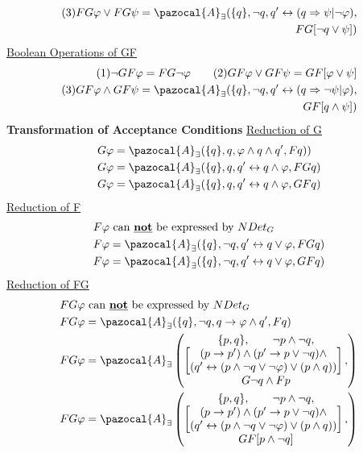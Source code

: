 \documentclass{article}
\newcommand{\Ab}{\pazocal{A}}
\begin{document}
\begin{multicols}{4}
\begin{align*}
(3) FG \varphi \vee FG \psi = \Ab_{\exists}(\{q\}, \neg q, q' \leftrightarrow (q \Rightarrow \psi | \neg \varphi),\\
FG[\neg q \vee \psi])
\end{align*}
\underline{Boolean Operations of GF}
\begin{align*}
(1)\neg GF \varphi = FG \neg \varphi \qquad(2)GF \varphi \vee GF \psi = GF[\varphi \vee \psi]\\
(3) GF \varphi \wedge GF \psi = \Ab_{\exists}(\{q\}, \neg q, q' \leftrightarrow (q \Rightarrow \neg \psi | \varphi),\\
GF[q \wedge \psi])
\end{align*}
\textbf{Transformation of Acceptance Conditions}
\underline{Reduction of G}
\begin{align*}
G\varphi &= \Ab_{\exists}(\{q\},q,\varphi \wedge q \wedge q',F q))\\
G\varphi &= \Ab_{\exists}(\{q\},q, q' \leftrightarrow q \wedge \varphi,FG q) \\
G\varphi &= \Ab_{\exists}(\{q\},q, q' \leftrightarrow q \wedge \varphi,GF q) 
\end{align*}
\underline{Reduction of F}
\begin{align*}
F\varphi &\text{ can \textbf{\underline{not}} be expressed by } NDet_G\\
F\varphi &= \Ab_{\exists}(\{q\},\neg q, q' \leftrightarrow q \vee \varphi,FG q) \\
F\varphi &= \Ab_{\exists}(\{q\},\neg q, q' \leftrightarrow q \vee \varphi,GF q) 
\end{align*}
\underline{Reduction of FG}
\begin{align*}
FG\varphi &\text{ can \textbf{\underline{not}} be expressed by } NDet_G\\
FG\varphi &= \Ab_{\exists}(\{q\},\neg q, q \rightarrow \varphi \wedge q',F q) \\
FG\varphi &= \Ab_{\exists} \begin{pmatrix}
\{p,q\},\qquad \neg p \wedge \neg q,\\
	\begin{bmatrix}
(p \rightarrow p') \wedge (p' \rightarrow p \vee \neg q) \wedge \\
(q' \leftrightarrow (p \wedge \neg q \vee \neg \varphi) \vee (p \wedge q))
    \end{bmatrix},\\
    G \neg q \wedge F p
\end{pmatrix}\\
FG\varphi &= \Ab_{\exists} \begin{pmatrix}
\{p,q\},\qquad \neg p \wedge \neg q,\\
	\begin{bmatrix}
(p \rightarrow p') \wedge (p' \rightarrow p \vee \neg q) \wedge \\
(q' \leftrightarrow (p \wedge \neg q \vee \neg \varphi) \vee (p \wedge q))
    \end{bmatrix},\\
    GF[p \wedge \neg q]
\end{pmatrix}
\end{align*}


\end{multicols}
\end{document}

